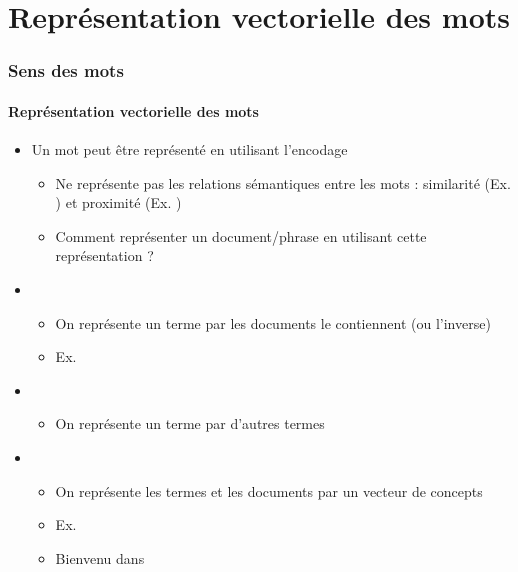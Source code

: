 \documentclass[xcolor=table]{beamer}
\begin{document}
\section{Représentation vectorielle des mots}

\begin{frame}
\frametitle{Sens des mots}
\framesubtitle{Représentation vectorielle des mots}

\begin{itemize}
	\item Un mot peut être représenté en utilisant l'encodage  
	\begin{itemize}
		\item Ne représente pas les relations sémantiques entre les mots : similarité (Ex. ) et proximité (Ex. )
		\item Comment représenter un document/phrase en utilisant cette représentation ?
	\end{itemize}

	\item {}
	\begin{itemize}
		\item On représente un terme par les documents le contiennent (ou l'inverse)
		\item Ex. 
	\end{itemize}

	\item {}
	\begin{itemize}
		\item On représente un terme par d'autres termes
	\end{itemize}

	\item {}
	\begin{itemize}
		\item On représente les termes et les documents par un vecteur de concepts
		\item Ex. 
		\item Bienvenu dans 
	\end{itemize}

\end{itemize}

\end{frame}
\end{document}
